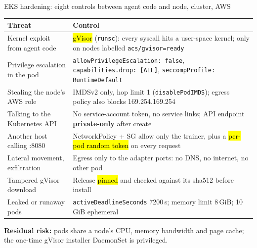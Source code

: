 \begin{frame}{EKS hardening: eight controls between agent code and node, cluster, AWS}
\scriptsize
\begin{tabularx}{\textwidth}{@{}>{\raggedright\arraybackslash}p{3.6cm}X@{}}
\toprule
\textbf{Threat} & \textbf{Control}\\
\midrule
Kernel exploit from agent code & \hl{gVisor} (\texttt{runsc}): every syscall hits a user-space kernel; only on nodes labelled \texttt{acs/gvisor=ready}\\
Privilege escalation in the pod & \texttt{allowPrivilegeEscalation: false}, \texttt{capabilities.drop: [ALL]}, \texttt{seccompProfile: RuntimeDefault}\\
Stealing the node's AWS role & IMDSv2 only, hop limit 1 (\texttt{disablePodIMDS}); egress policy also blocks 169.254.169.254\\
Talking to the Kubernetes API & No service-account token, no service links; API endpoint \textbf{private-only} after create\\
Another host calling :8080 & NetworkPolicy + SG allow only the trainer, plus a \hl{per-pod random token} on every request\\
Lateral movement, exfiltration & Egress only to the adapter ports: no DNS, no internet, no other pod\\
Tampered gVisor download & Release \hl{pinned} and checked against its sha512 before install\\
Leaked or runaway pods & \texttt{activeDeadlineSeconds} 7200\,s; memory limit 8\,GiB; 10\,GiB ephemeral\\
\bottomrule
\end{tabularx}
\par\vspace{1mm}
{\scriptsize\raggedright\textbf{Residual risk:} pods share a node's CPU, memory bandwidth and page cache; the one-time gVisor installer DaemonSet is privileged.\par}
\end{frame}


